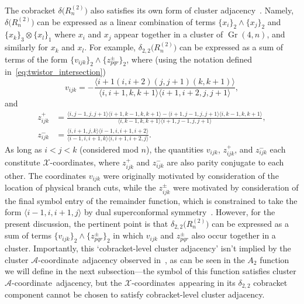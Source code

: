 \documentclass[12pt]{article}
\DeclareMathOperator{\Gr}{Gr}
\def\ket#1{\langle #1 \rangle}
\def\xcoords{$\mathcal{X}$-coordinates}
\def\acoord{$\mathcal{A}$-coordinate}
\def\acoords{$\mathcal{A}$-coordinates}
\begin{document}

The cobracket $\delta\big(R^{(2)}_n\big)$ also satisfies its own form of cluster adjacency~\cite{Golden:2014pua}. Namely, $\delta\big(R^{(2)}_n\big)$ can be expressed as a linear combination of terms $\{x_i\}_2 \wedge \{x_j\}_2$ and $\{x_k\}_3 \otimes \{x_l\}_1$ where $x_i$ and $x_j$ appear together in a cluster of $\Gr(4,n)$, and similarly for $x_k$ and $x_l$. For example, $\delta_{2,2}\big(R^{(2)}_n\big)$ can be expressed as a sum of terms of the form $\{ v_{ijk} \}_2 \wedge \{ z^{\pm}_{pqr} \}_2$, where (using the notation defined in~\eqref{eq:twistor_intersection})
\begin{equation}
v_{ijk} = - \frac{\ket{i\!+\!1 (i,i\!+\!2) (j,j\!+\!1)(k,k\!+\!1)}}{\ket{i,i\!+\!1,k,k\!+\!1}\ket{i\!+\!1,i\!+\!2,j,j\!+\!1}},
\end{equation}
and
\begin{align}
z_{ijk}^+ &= \frac{\ket{i,j\!-\!1,j,j\!+\!1}\ket{i\!+\!1,k\!-\!1,k,k\!+\!1}  -  \ket{i\!+\!1,j\!-\!1,j,j\!+\!1}\ket{i,k\!-\!1,k,k\!+\!1}}{\ket{i,k\!-\!1,k,k\!+\!1}\ket{i\!+\!1,j\!-\!1,j,j\!+\!1}}, \nonumber \\
z_{ijk}^- &= \frac{\ket{i,i\!+\!1,j,k}\ket{i\!-\!1,i,i\!+\!1,i\!+\!2}}{\ket{i\!-\!1,i,i\!+\!1,k}\ket{i,i\!+\!1,i\!+\!2,j}}.
\end{align}
As long as $i<j<k$ (considered mod $n$), the quantities $v_{ijk}$, $z_{ijk}^+$, and $z_{ijk}^-$ each constitute \xcoords, where $z_{ijk}^+$ and $z_{ijk}^-$ are also parity conjugate to each other. The coordinates $v_{ijk}$ were originally motivated by consideration of the location of physical branch cuts, while the $z_{ijk}^\pm$ were motivated by consideration of the final symbol entry of the remainder function, which is constrained to take the form $\ket{i-1,i,i+1,j}$ by dual superconformal symmetry~\cite{CaronHuot:2011kk}. However, for the present discussion, the pertinent point is that $\delta_{2,2}\big(R^{(2)}_n\big)$ can be expressed as a sum of terms $\{ v_{ijk} \}_2 \wedge \{ z^{\pm}_{pqr} \}_2$ in which $v_{ijk}$ and $z^{\pm}_{pqr}$ also occur together in a cluster. Importantly, this `cobracket-level cluster adjacency' isn't implied by the cluster \acoord\ adjacency observed in~\cite{Drummond:2017ssj}, as can be seen in the $A_2$ function we will define in the next subsection---the symbol of this function satisfies cluster \acoord\ adjacency, but the \xcoords\ appearing in its $\delta_{2,2}$ cobracket component cannot be chosen to satisfy cobracket-level cluster adjacency.
\end{document}
